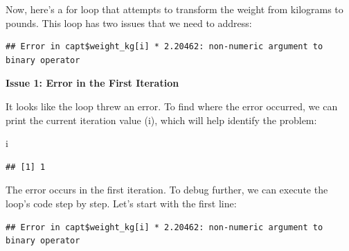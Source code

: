 \documentclass[
]{book}
\newenvironment{Shaded}{\begin{snugshade}}{\end{snugshade}}
\newcommand{\ControlFlowTok}[1]{\textcolor[rgb]{0.13,0.29,0.53}{\textbf{#1}}}
\newcommand{\DecValTok}[1]{\textcolor[rgb]{0.00,0.00,0.81}{#1}}
\newcommand{\FloatTok}[1]{\textcolor[rgb]{0.00,0.00,0.81}{#1}}
\newcommand{\FunctionTok}[1]{\textcolor[rgb]{0.13,0.29,0.53}{\textbf{#1}}}
\newcommand{\NormalTok}[1]{#1}
\newcommand{\OtherTok}[1]{\textcolor[rgb]{0.56,0.35,0.01}{#1}}
\newcommand{\SpecialCharTok}[1]{\textcolor[rgb]{0.81,0.36,0.00}{\textbf{#1}}}
\begin{document}
Now, here's a for loop that attempts to transform the weight from kilograms to pounds. This loop has two issues that we need to address:

\begin{Shaded}
\end{Shaded}

\begin{verbatim}
## Error in capt$weight_kg[i] * 2.20462: non-numeric argument to binary operator
\end{verbatim}

\textbf{Issue 1: Error in the First Iteration}

It looks like the loop threw an error. To find where the error occurred, we can print the current iteration value (i), which will help identify the problem:

\begin{Shaded}
\begin{Highlighting}[]
\NormalTok{i}
\end{Highlighting}
\end{Shaded}

\begin{verbatim}
## [1] 1
\end{verbatim}

The error occurs in the first iteration. To debug further, we can execute the loop's code step by step. Let's start with the first line:

\begin{Shaded}
\end{Shaded}

\begin{verbatim}
## Error in capt$weight_kg[i] * 2.20462: non-numeric argument to binary operator
\end{verbatim}
\end{document}
